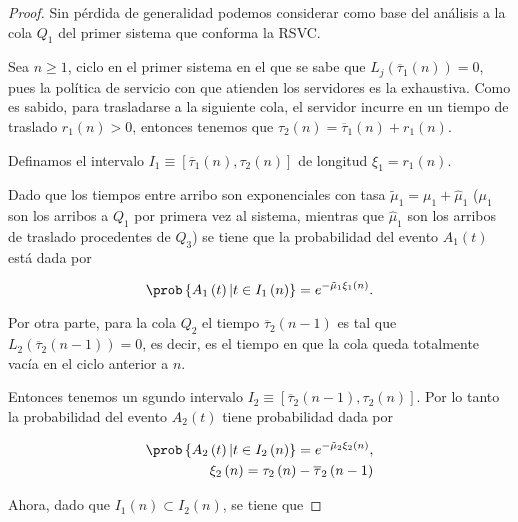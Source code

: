 \begin{proof}
Sin p\'erdida de generalidad podemos considerar como base del an\'alisis a la cola $Q_{1}$ del primer sistema que conforma la RSVC.\medskip 

Sea $n\geq1$, ciclo en el primer sistema en el que se sabe que $L_{j}\left(\overline{\tau}_{1}\left(n\right)\right)=0$, pues la pol\'itica de servicio con que atienden los servidores es la exhaustiva. Como es sabido, para trasladarse a la siguiente cola, el servidor incurre en un tiempo de traslado $r_{1}\left(n\right)>0$, entonces tenemos que $\tau_{2}\left(n\right)=\overline{\tau}_{1}\left(n\right)+r_{1}\left(n\right)$.\medskip 


Definamos el intervalo $I_{1}\equiv\left[\overline{\tau}_{1}\left(n\right),\tau_{2}\left(n\right)\right]$ de longitud $\xi_{1}=r_{1}\left(n\right)$.

Dado que los tiempos entre arribo son exponenciales con tasa $\tilde{\mu}_{1}=\mu_{1}+\hat{\mu}_{1}$ ($\mu_{1}$ son los arribos a $Q_{1}$ por primera vez al sistema, mientras que $\hat{\mu}_{1}$ son los arribos de traslado procedentes de $Q_{3}$) se tiene que la probabilidad del evento $A_{1}\left(t\right)$ est\'a dada por 

\begin{equation}
\prob\left\{A_{1}\left(t\right)|t\in I_{1}\left(n\right)\right\}=e^{-\tilde{\mu}_{1}\xi_{1}\left(n\right)}.
\end{equation} 


Por otra parte, para la cola $Q_{2}$ el tiempo $\overline{\tau}_{2}\left(n-1\right)$ es tal que $L_{2}\left(\overline{\tau}_{2}\left(n-1\right)\right)=0$, es decir, es el tiempo en que la cola queda totalmente vac\'ia en el ciclo anterior a $n$. \medskip 


Entonces tenemos un sgundo intervalo $I_{2}\equiv\left[\overline{\tau}_{2}\left(n-1\right),\tau_{2}\left(n\right)\right]$. Por lo tanto la probabilidad del evento $A_{2}\left(t\right)$ tiene probabilidad dada por

\begin{eqnarray}
\prob\left\{A_{2}\left(t\right)|t\in I_{2}\left(n\right)\right\}=e^{-\tilde{\mu}_{2}\xi_{2}\left(n\right)},\\
\xi_{2}\left(n\right)=\tau_{2}\left(n\right)-\overline{\tau}_{2}\left(n-1\right)
\end{eqnarray}


Ahora, dado que $I_{1}\left(n\right)\subset I_{2}\left(n\right)$, se tiene que


\end{proof}
